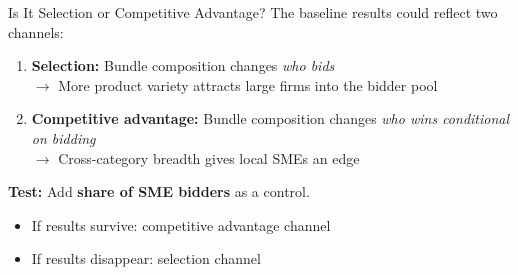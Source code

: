 \documentclass[9pt,aspectratio=169]{beamer}
\begin{document}
\begin{frame}{Is It Selection or Competitive Advantage?}
The baseline results could reflect two channels:
\begin{enumerate}
  \item \textbf{Selection:} Bundle composition changes \textit{who bids} \\
        $\to$ More product variety attracts large firms into the bidder pool
  \item \textbf{Competitive advantage:} Bundle composition changes \textit{who wins conditional on bidding} \\
        $\to$ Cross-category breadth gives local SMEs an edge
\end{enumerate}

\bigskip
\textbf{Test:} Add \textbf{share of SME bidders} as a control.
\begin{itemize}
  \item If results survive: competitive advantage channel
  \item If results disappear: selection channel
\end{itemize}
\end{frame}
\end{document}
